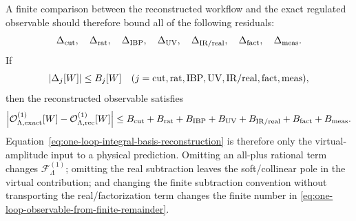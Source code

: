 \begin{controlledapproximation}
A finite comparison between the reconstructed workflow and the exact
regulated observable should therefore bound all of the following residuals:
\[
  \Delta_{\rm cut},\quad
  \Delta_{\rm rat},\quad
  \Delta_{\rm IBP},\quad
  \Delta_{\rm UV},\quad
  \Delta_{\rm IR/real},\quad
  \Delta_{\rm fact},\quad
  \Delta_{\rm meas}.
\]
If
\[
  |\Delta_j[W]|\le B_j[W]
  \quad
  (j={\rm cut,rat,IBP,UV,IR/real,fact,meas}),
\]
then the reconstructed observable satisfies
\begin{equation}
  \left|
    \mathcal O_{\Lambda,{\rm exact}}^{(1)}[W]
    -
    \mathcal O_{\Lambda,{\rm rec}}^{(1)}[W]
  \right|
  \le
  B_{\rm cut}+B_{\rm rat}+B_{\rm IBP}+B_{\rm UV}
  +B_{\rm IR/real}+B_{\rm fact}+B_{\rm meas}.
  \label{eq:one-loop-observable-reconstruction-bound}
\end{equation}
Equation~\eqref{eq:one-loop-integral-basis-reconstruction} is therefore only
the virtual-amplitude input to a physical prediction.  Omitting an all-plus
rational term changes \(\mathcal F^{(1)}_\Lambda\); omitting the real
subtraction leaves the soft/collinear pole in the virtual contribution; and
changing the finite subtraction convention without transporting the
real/factorization term changes the finite number in
\eqref{eq:one-loop-observable-from-finite-remainder}.
\end{controlledapproximation}

